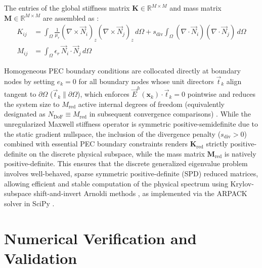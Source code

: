 \documentclass[preprint,12pt]{elsarticle}
\begin{document}
The entries of the global stiffness matrix $\mathbf{K} \in \mathbb{R}^{M \times M}$ and mass matrix $\mathbf{M} \in \mathbb{R}^{M \times M}$ are assembled as \cite{goncalves2025tese}:
\begin{align}
K_{ij} &= \int_{\Omega} \frac{1}{\mu_r} (\nabla \times \vec{N}_i)_z (\nabla \times \vec{N}_j)_z \, d\Omega + s_{\mathrm{div}} \int_{\Omega} (\nabla \cdot \vec{N}_i)(\nabla \cdot \vec{N}_j) \, d\Omega \label{eq:stiffness_matrix_entry} \\
M_{ij} &= \int_{\Omega} \epsilon_r \, \vec{N}_i \cdot \vec{N}_j \, d\Omega \label{eq:mass_matrix_entry}
\end{align}

Homogeneous PEC boundary conditions are collocated directly at boundary nodes by setting $e_k = 0$ for all boundary nodes whose unit directors $\vec{t}_k$ align tangent to $\partial\Omega$ ($\vec{t}_k \parallel \partial\Omega$), which enforces $\vec{E}^h(\mathbf{x}_k) \cdot \vec{t}_k = 0$ pointwise and reduces the system size to $M_{\mathrm{red}}$ active internal degrees of freedom (equivalently designated as $N_{\mathrm{DoF}} \equiv M_{\mathrm{red}}$ in subsequent convergence comparisons) \cite{ortiz2021nodal, goncalves2025tese}. While the unregularized Maxwell stiffness operator is symmetric positive-semidefinite due to the static gradient nullspace, the inclusion of the divergence penalty ($s_{\mathrm{div}} > 0$) combined with essential PEC boundary constraints renders $\mathbf{K}_{\mathrm{red}}$ strictly positive-definite on the discrete physical subspace, while the mass matrix $\mathbf{M}_{\mathrm{red}}$ is natively positive-definite. This ensures that the discrete generalized eigenvalue problem involves well-behaved, sparse symmetric positive-definite (SPD) reduced matrices, allowing efficient and stable computation of the physical spectrum using Krylov-subspace shift-and-invert Arnoldi methods \cite{saad2011numerical, lehoucq1998arpack}, as implemented via the ARPACK solver in SciPy \cite{virtanen2020scipy}.

\section{Numerical Verification and Validation}
\label{sec:numerical_results}
\end{document}
